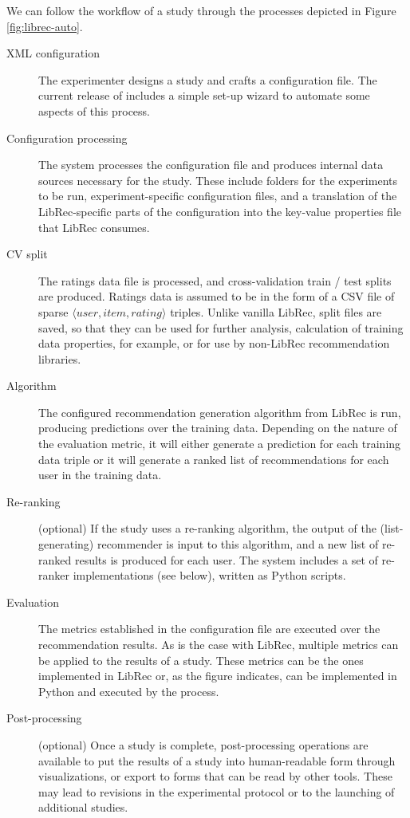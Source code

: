 We can follow the workflow of a study through the processes depicted in Figure \ref{fig:librec-auto}.

\begin{description}

    \item [XML configuration] The experimenter designs a study and crafts a configuration file. The current release of \libauto{} includes a simple set-up wizard to automate some aspects of this process.

    \item [Configuration processing] The system processes the configuration file and produces internal data sources necessary for the study. These include folders for the experiments to be run, experiment-specific configuration files, and a translation of the LibRec-specific parts of the configuration into the key-value properties file that LibRec consumes.

    \item [CV split] The ratings data file is processed, and cross-validation train / test splits are produced. Ratings data is assumed to be in the form of a CSV file of sparse $\langle user, item, rating \rangle$ triples. Unlike vanilla LibRec, split files are saved, so that they can be used for further analysis, calculation of training data properties, for example, or for use by non-LibRec recommendation libraries.

    \item [Algorithm] The configured recommendation generation algorithm from LibRec is run, producing predictions over the training data. Depending on the nature of the evaluation metric, it will either generate a prediction for each training data triple or it will generate a ranked list of recommendations for each user in the training data. 
    
    \item [Re-ranking] (optional) If the study uses a re-ranking algorithm, the output of the (list-generating) recommender is input to this algorithm, and a new list of re-ranked results is produced for each user. The system includes a set of re-ranker implementations (see below), written as Python scripts. 

    \item [Evaluation] The metrics established in the configuration file are executed over the recommendation results. As is the case with LibRec, multiple metrics can be applied to the results of a study. These metrics can be the ones implemented in LibRec or, as the figure indicates, can be implemented in Python and executed by the \libauto{} process.

    \item [Post-processing] (optional) Once a study is complete, post-processing operations are available to put the results of a study into human-readable form through visualizations, or export to forms that can be read by other tools. These may lead to revisions in the experimental protocol or to the launching of additional studies.

\end{description}

